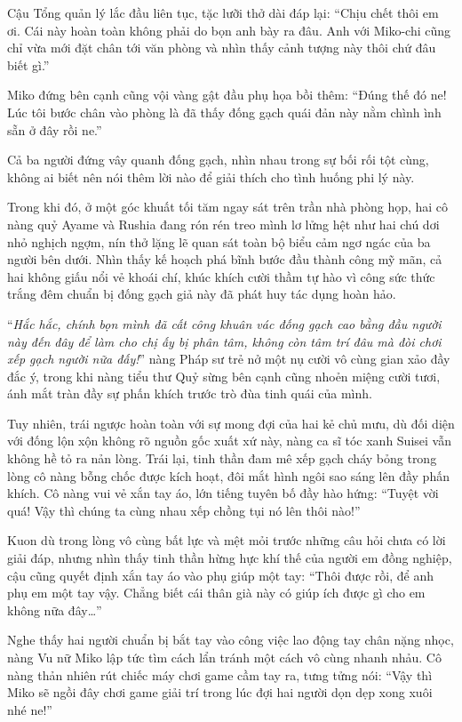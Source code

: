 \documentclass[../main.tex]{subfiles}
\begin{document}

Cậu Tổng quản lý lắc đầu liên tục, tặc lưỡi thở dài đáp lại: ``Chịu chết thôi em ơi. Cái này hoàn toàn không phải do bọn anh bày ra đâu. Anh với Miko-chi cũng chỉ vừa mới đặt chân tới văn phòng và nhìn thấy cảnh tượng này thôi chứ đâu biết gì.''

Miko đứng bên cạnh cũng vội vàng gật đầu phụ họa bồi thêm: ``Đúng thế đó ne! Lúc tôi bước chân vào phòng là đã thấy đống gạch quái đản này nằm chình ình sẵn ở đây rồi ne.''

Cả ba người đứng vây quanh đống gạch, nhìn nhau trong sự bối rối tột cùng, không ai biết nên nói thêm lời nào để giải thích cho tình huống phi lý này.

Trong khi đó, ở một góc khuất tối tăm ngay sát trên trần nhà phòng họp, hai cô nàng quỷ Ayame và Rushia đang rón rén treo mình lơ lửng hệt như hai chú dơi nhỏ nghịch ngợm, nín thở lặng lẽ quan sát toàn bộ biểu cảm ngơ ngác của ba người bên dưới. Nhìn thấy kế hoạch phá bĩnh bước đầu thành công mỹ mãn, cả hai không giấu nổi vẻ khoái chí, khúc khích cười thầm tự hào vì công sức thức trắng đêm chuẩn bị đống gạch giả này đã phát huy tác dụng hoàn hảo.

``\textit{Hắc hắc, chính bọn mình đã cất công khuân vác đống gạch cao bằng đầu người này đến đây để làm cho chị ấy bị phân tâm, không còn tâm trí đâu mà đòi chơi xếp gạch người nữa đấy!}'' nàng Pháp sư trẻ nở một nụ cười vô cùng gian xảo đầy đắc ý, trong khi nàng tiểu thư Quỷ sừng bên cạnh cũng nhoẻn miệng cười tươi, ánh mắt tràn đầy sự phấn khích trước trò đùa tinh quái của mình.

Tuy nhiên, trái ngược hoàn toàn với sự mong đợi của hai kẻ chủ mưu, dù đối diện với đống lộn xộn không rõ nguồn gốc xuất xứ này, nàng ca sĩ tóc xanh Suisei vẫn không hề tỏ ra nản lòng. Trái lại, tinh thần đam mê xếp gạch cháy bỏng trong lòng cô nàng bỗng chốc được kích hoạt, đôi mắt hình ngôi sao sáng lên đầy phấn khích. Cô nàng vui vẻ xắn tay áo, lớn tiếng tuyên bố đầy hào hứng: ``Tuyệt vời quá! Vậy thì chúng ta cùng nhau xếp chồng tụi nó lên thôi nào!''

Kuon dù trong lòng vô cùng bất lực và mệt mỏi trước những câu hỏi chưa có lời giải đáp, nhưng nhìn thấy tinh thần hừng hực khí thế của người em đồng nghiệp, cậu cũng quyết định xắn tay áo vào phụ giúp một tay: ``Thôi được rồi, để anh phụ em một tay vậy. Chẳng biết cái thân già này có giúp ích được gì cho em không nữa đây\dots''

Nghe thấy hai người chuẩn bị bắt tay vào công việc lao động tay chân nặng nhọc, nàng Vu nữ Miko lập tức tìm cách lẩn tránh một cách vô cùng nhanh nhảu. Cô nàng thản nhiên rút chiếc máy chơi game cầm tay ra, tưng tửng nói: ``Vậy thì Miko sẽ ngồi đây chơi game giải trí trong lúc đợi hai người dọn dẹp xong xuôi nhé ne!''
\end{document}
